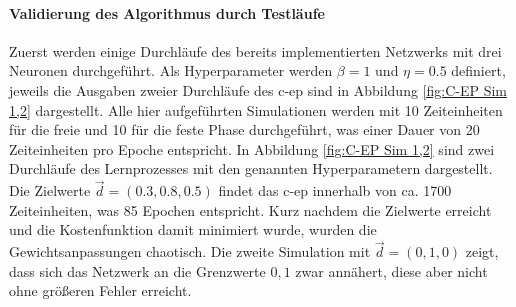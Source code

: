 \paragraph{Validierung des Algorithmus durch Testläufe}
\label{chap:Validierung des Algorithmus durch Testläufe}

Zuerst werden einige Durchläufe des bereits implementierten Netzwerks mit drei Neuronen durchgeführt. Als Hyperparameter werden \(\beta=1\) und \(\eta=0.5\) definiert, jeweils die Ausgaben zweier Durchläufe des \gls{c-ep} sind in Abbildung \ref{fig:C-EP Sim 1,2} dargestellt. Alle hier aufgeführten Simulationen werden mit 10 Zeiteinheiten für die freie und 10 für die feste Phase durchgeführt, was einer Dauer von 20 Zeiteinheiten pro Epoche entspricht. In Abbildung \ref{fig:C-EP Sim 1,2} sind zwei Durchläufe des Lernprozesses mit den genannten Hyperparametern dargestellt. Die Zielwerte \(\vec{d}=(0.3,0.8,0.5)\) findet das \gls{c-ep} innerhalb von ca. 1700 Zeiteinheiten, was 85 Epochen entspricht. Kurz nachdem die Zielwerte erreicht und die Kostenfunktion damit minimiert wurde, wurden die Gewichtsanpassungen chaotisch. Die zweite Simulation mit \(\vec{d}=(0,1,0)\) zeigt, dass sich das Netzwerk an die Grenzwerte \(0,1\) zwar annähert, diese aber nicht ohne größeren Fehler erreicht.

